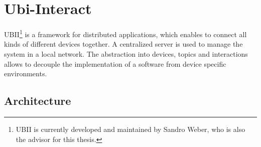 \section{Ubi-Interact}\label{section:ubi-interact}
\setcounter{footnote}{0} %

\ac{UBII}\footnote{UBII is currently developed and maintained by Sandro Weber, who is also the advisor for this thesis.} is a framework for distributed applications, which enables to connect all kinds of different devices together. A centralized server is used to manage the system in a local network.  The abstraction into devices, topics and interactions allows to decouple the implementation of a software from device specific environments.


\subsection{Architecture}\label{subsection:architecture}

